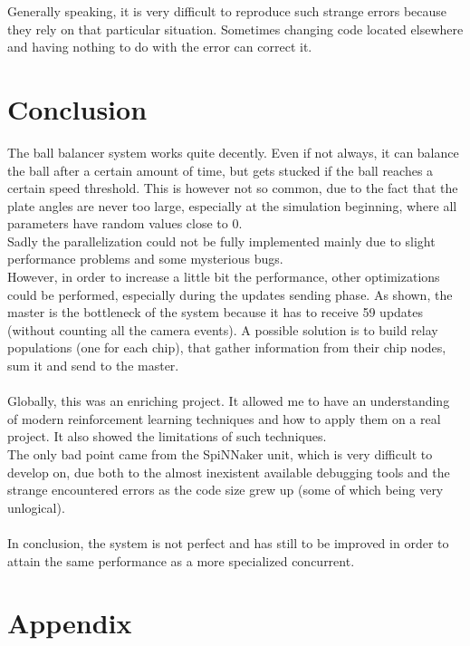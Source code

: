 \documentclass{article}
\begin{document}
Generally speaking, it is very difficult to reproduce such strange errors because they rely on that particular situation. Sometimes changing code located elsewhere and having nothing to do with the error can correct it.


\section{Conclusion}
The ball balancer system works quite decently. Even if not always, it can balance the ball after a certain amount of time, but gets stucked if the ball reaches a certain speed threshold. This is however not so common, due to the fact that the plate angles are never too large, especially at the simulation beginning, where all parameters have random values close to 0.\\

Sadly the parallelization could not be fully implemented mainly due to slight performance problems and some mysterious bugs.\\
However, in order to increase a little bit the performance, other optimizations could be performed, especially during the updates sending phase. As shown, the master is the bottleneck of the system because it has to receive 59 updates (without counting all the camera events). A possible solution is to build relay populations (one for each chip), that gather information from their chip nodes, sum it and send to the master.\\ \\


Globally, this was an enriching project. It allowed me to have an understanding of modern reinforcement learning techniques and how to apply them on a real project. It also showed the limitations of such techniques. \\
The only bad point came from the SpiNNaker unit, which is very difficult to develop on, due both to the almost inexistent available debugging tools and the strange encountered errors as the code size grew up (some of which being very unlogical).\\ \\


In conclusion, the system is not perfect and has still to be improved in order to attain the same performance as a more specialized concurrent.


\section{Appendix}
\end{document}
